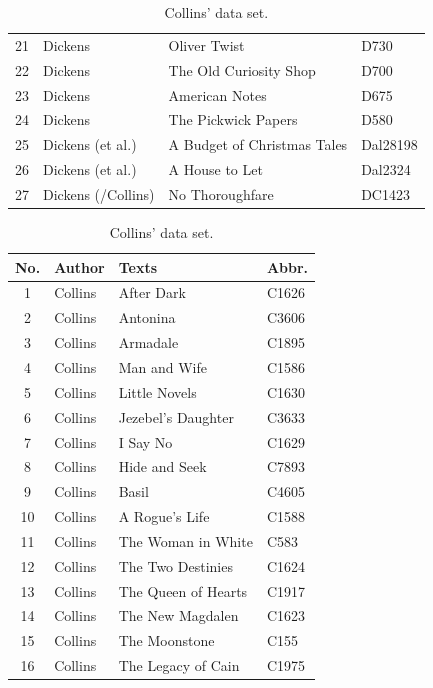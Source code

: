 \documentclass[a4paper,10pt,twoside,fleqn]{article}
\begin{document}
\begin{table}
\begin{minipage}{.62\linewidth}
\begin{tabular}{c l l l}
21		& Dickens		& Oliver Twist				& D730        \\
22		& Dickens		&The Old Curiosity Shop			& D700         \\
23		& Dickens		& American Notes			& D675         \\
24		& Dickens		&The Pickwick Papers			& D580           \\
25		& Dickens     (et al.)  & A Budget of Christmas Tales		& Dal28198         \\
26		& Dickens (et al.)	& A House to Let			& Dal2324     \\
27		& Dickens (/Collins)     & No Thoroughfare			& DC1423       \\ \bottomrule
\end{tabular}
\end{minipage}%
\hfill
    \begin{minipage}{.62\linewidth}
      \centering
      \caption{Collins' data set.} %
\label{table:Collins-data}
\begin{tabular}{c l l l } \\\hline \hline
\textbf{No.}	& \textbf{Author} 		& \textbf{Texts} 		& \textbf{Abbr.} \\ \hline
1		& Collins       		& After Dark			& C1626    \\
2		& Collins			& Antonina			& C3606        \\
3		& Collins			& Armadale			& C1895  \\
4		& Collins			& Man and Wife			& C1586      \\
5		& Collins			& Little Novels			& C1630    \\
6		& Collins			& Jezebel's Daughter		& C3633    \\
7		& Collins			& I Say No			& C1629       \\
8		& Collins			& Hide and Seek			& C7893  \\
9		& Collins			& Basil				& C4605 \\
10		& Collins			& A Rogue's Life		& C1588     \\
11		& Collins			& The Woman in White		& C583         \\
12		& Collins			& The Two Destinies		& C1624    \\
13		& Collins			& The Queen of Hearts		& C1917        \\
14		& Collins			& The New Magdalen		& C1623     \\
15		& Collins			& The Moonstone			& C155         \\
16		& Collins			& The Legacy of Cain		& C1975       \\

\end{tabular}
\end{minipage}
\end{table}
\end{document}
